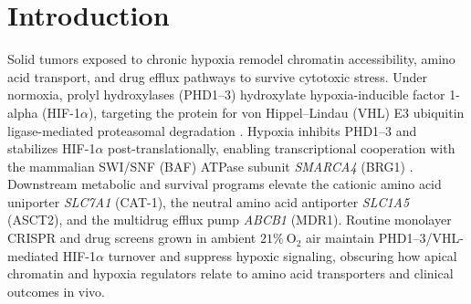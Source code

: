 \documentclass[10pt,twocolumn]{article}
\begin{document}
\begin{abstract}
baseline risk. Lineage-independent \textit{SLFN11} and \textit{BAK1} gates remained intact on both $1 - \text{AUC}$ and $\ln(\text{IC}_{50})$. Harmonized UCSC Xena Toil comparisons against GTEx v6 showed high normal cardiac ($44.08\text{--}59.22$ TPM) and hepatic ($67.54$ TPM) \textit{MCL1} relative to solid tumors ($114.25$ TPM), pointing toward tumor-targeted delivery and physiological hypoxia models while public human AZD5991 pharmacokinetics remain incomplete.
\end{abstract}

\section{Introduction}
Solid tumors exposed to chronic hypoxia remodel chromatin accessibility, amino acid transport, and drug efflux pathways to survive cytotoxic stress. Under normoxia, prolyl hydroxylases (PHD1--3) hydroxylate hypoxia-inducible factor 1-alpha (HIF-1$\alpha$), targeting the protein for von Hippel--Lindau (VHL) E3 ubiquitin ligase-mediated proteasomal degradation \cite{ivan2001,jaakkola2001}. Hypoxia inhibits PHD1--3 and stabilizes HIF-1$\alpha$ post-translationally, enabling transcriptional cooperation with the mammalian SWI/SNF (BAF) ATPase subunit \textit{SMARCA4} (BRG1) \cite{kenneth2009,sena2013}. Downstream metabolic and survival programs elevate the cationic amino acid uniporter \textit{SLC7A1} (CAT-1), the neutral amino acid antiporter \textit{SLC1A5} (ASCT2), and the multidrug efflux pump \textit{ABCB1} (MDR1). Routine monolayer CRISPR and drug screens grown in ambient $21\%\ \text{O}_2$ air maintain PHD1--3/VHL-mediated HIF-1$\alpha$ turnover and suppress hypoxic signaling, obscuring how apical chromatin and hypoxia regulators relate to amino acid transporters and clinical outcomes in vivo.
\end{document}

